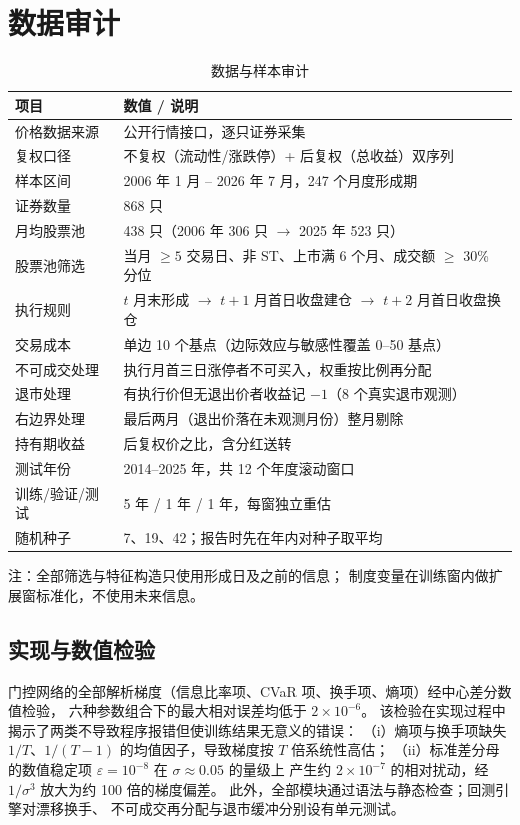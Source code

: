 \section{数据审计}
\label{app:audit}

\begin{table}[htbp]
\centering
\caption{数据与样本审计}
\label{tab:audit}
\begin{threeparttable}
\small
\begin{tabular}{ll}
\toprule
项目 & 数值 / 说明 \\
\midrule
价格数据来源 & 公开行情接口，逐只证券采集 \\
复权口径 & 不复权（流动性/涨跌停）+ 后复权（总收益）双序列 \\
样本区间 & 2006 年 1 月 -- 2026 年 7 月，247 个月度形成期 \\
证券数量 & 868 只 \\
月均股票池 & 438 只（2006 年 306 只 $\to$ 2025 年 523 只） \\
股票池筛选 & 当月 $\ge5$ 交易日、非 ST、上市满 6 个月、成交额 $\ge$ 30\% 分位 \\
执行规则 & $t$ 月末形成 $\to$ $t{+}1$ 月首日收盘建仓 $\to$ $t{+}2$ 月首日收盘换仓 \\
交易成本 & 单边 10 个基点（边际效应与敏感性覆盖 0--50 基点） \\
不可成交处理 & 执行月首三日涨停者不可买入，权重按比例再分配 \\
退市处理 & 有执行价但无退出价者收益记 $-1$（8 个真实退市观测） \\
右边界处理 & 最后两月（退出价落在未观测月份）整月剔除 \\
持有期收益 & 后复权价之比，含分红送转 \\
测试年份 & 2014--2025 年，共 12 个年度滚动窗口 \\
训练/验证/测试 & 5 年 / 1 年 / 1 年，每窗独立重估 \\
随机种子 & 7、19、42；报告时先在年内对种子取平均 \\
\bottomrule
\end{tabular}
\begin{tablenotes}[flushleft]\footnotesize
\item 注：全部筛选与特征构造只使用形成日及之前的信息；
制度变量在训练窗内做扩展窗标准化，不使用未来信息。
\end{tablenotes}
\end{threeparttable}
\end{table}

\subsection*{实现与数值检验}

门控网络的全部解析梯度（信息比率项、CVaR 项、换手项、熵项）经中心差分数值检验，
六种参数组合下的最大相对误差均低于 $2\times10^{-6}$。
该检验在实现过程中揭示了两类不导致程序报错但使训练结果无意义的错误：
（i）熵项与换手项缺失 $1/T$、$1/(T-1)$ 的均值因子，导致梯度按 $T$ 倍系统性高估；
（ii）标准差分母的数值稳定项 $\varepsilon=10^{-8}$ 在 $\sigma\approx0.05$ 的量级上
产生约 $2\times10^{-7}$ 的相对扰动，经 $1/\sigma^3$ 放大为约 100 倍的梯度偏差。
此外，全部模块通过语法与静态检查；回测引擎对漂移换手、
不可成交再分配与退市缓冲分别设有单元测试。
